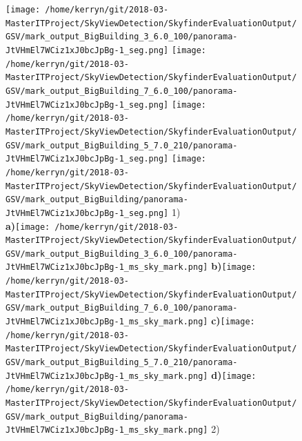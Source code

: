 \documentclass{article}
\begin{document}
\begin{figure}
\centering    
\textbf{}\texttt{[image: /home/kerryn/git/2018-03-MasterITProject/SkyViewDetection/SkyfinderEvaluationOutput/GSV/mark\_output\_BigBuilding\_3\_6.0\_100/panorama-JtVHmEl7WCiz1xJ0bcJpBg-1\_seg.png]} 
\textbf{}\texttt{[image: /home/kerryn/git/2018-03-MasterITProject/SkyViewDetection/SkyfinderEvaluationOutput/GSV/mark\_output\_BigBuilding\_7\_6.0\_100/panorama-JtVHmEl7WCiz1xJ0bcJpBg-1\_seg.png]} 
\textbf{}\texttt{[image: /home/kerryn/git/2018-03-MasterITProject/SkyViewDetection/SkyfinderEvaluationOutput/GSV/mark\_output\_BigBuilding\_5\_7.0\_210/panorama-JtVHmEl7WCiz1xJ0bcJpBg-1\_seg.png]} 
\textbf{}\texttt{[image: /home/kerryn/git/2018-03-MasterITProject/SkyViewDetection/SkyfinderEvaluationOutput/GSV/mark\_output\_BigBuilding/panorama-JtVHmEl7WCiz1xJ0bcJpBg-1\_seg.png]} \scriptsize{1)}
\\
\textbf{\scriptsize{a)}}\texttt{[image: /home/kerryn/git/2018-03-MasterITProject/SkyViewDetection/SkyfinderEvaluationOutput/GSV/mark\_output\_BigBuilding\_3\_6.0\_100/panorama-JtVHmEl7WCiz1xJ0bcJpBg-1\_ms\_sky\_mark.png]} 
\textbf{\scriptsize{b)}}\texttt{[image: /home/kerryn/git/2018-03-MasterITProject/SkyViewDetection/SkyfinderEvaluationOutput/GSV/mark\_output\_BigBuilding\_7\_6.0\_100/panorama-JtVHmEl7WCiz1xJ0bcJpBg-1\_ms\_sky\_mark.png]} 
\textbf{\scriptsize{c)}}\texttt{[image: /home/kerryn/git/2018-03-MasterITProject/SkyViewDetection/SkyfinderEvaluationOutput/GSV/mark\_output\_BigBuilding\_5\_7.0\_210/panorama-JtVHmEl7WCiz1xJ0bcJpBg-1\_ms\_sky\_mark.png]} 
\textbf{\scriptsize{d)}}\texttt{[image: /home/kerryn/git/2018-03-MasterITProject/SkyViewDetection/SkyfinderEvaluationOutput/GSV/mark\_output\_BigBuilding/panorama-JtVHmEl7WCiz1xJ0bcJpBg-1\_ms\_sky\_mark.png]} \scriptsize{2)}
\end{figure} 
\clearpage
\end{document}
